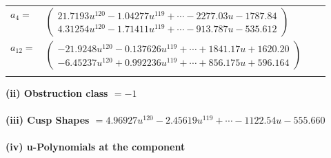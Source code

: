 \documentclass[1p]{elsarticle_modified}
\theoremstyle{definition}
\begin{document}
\begin{tabular}{m{7pt} m{180pt} m{7pt} m{180pt} }
\flushright $a_{4}=$&$\begin{pmatrix}21.7193 u^{120}-1.04277 u^{119}+\cdots-2277.03 u-1787.84\\4.31254 u^{120}-1.71411 u^{119}+\cdots-913.787 u-535.612\end{pmatrix}$ \\
\flushright $a_{12}=$&$\begin{pmatrix}-21.9248 u^{120}-0.137626 u^{119}+\cdots+1841.17 u+1620.20\\-6.45237 u^{120}+0.992236 u^{119}+\cdots+856.175 u+596.164\end{pmatrix}$\\&\end{tabular}
\flushleft \textbf{(ii) Obstruction class $= -1$}\\~\\
\flushleft \textbf{(iii) Cusp Shapes $= 4.96927 u^{120}-2.45619 u^{119}+\cdots-1122.54 u-555.660$}\\~\\
\newpage\renewcommand{\arraystretch}{1}
\flushleft \textbf{(iv) u-Polynomials at the component}\newline \\
\end{document}
